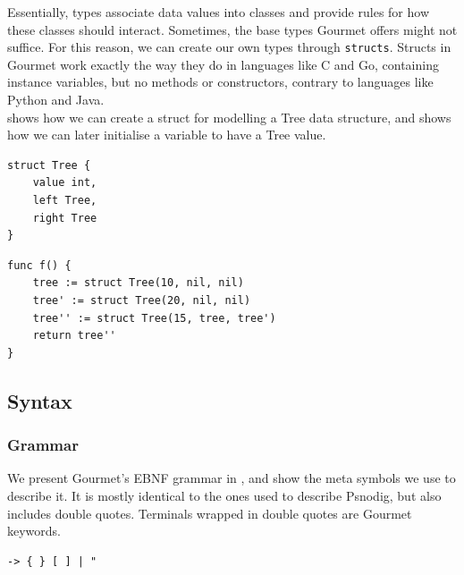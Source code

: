 Essentially, types associate data values into classes and provide rules for how these classes should interact. Sometimes, the base types Gourmet offers might not suffice. For this reason, we can create our own types through \texttt{structs}. Structs in Gourmet work exactly the way they do in languages like C and Go, containing instance variables, but no methods or constructors, contrary to languages like Python and Java. \\

 shows how we can create a struct for modelling a Tree data structure, and  shows how we can later initialise a variable to have a Tree value. \\

\begin{lstlisting}[caption={A Gourmet struct Tree, with instance variables \texttt{value}, \texttt{left} and \texttt{right}.}, captionpos=b, label={Gourmet Tree}]
struct Tree {
    value int,
    left Tree,
    right Tree
}
\end{lstlisting}

\begin{lstlisting}[caption={A function to initialise three Tree structs and return the last one.},captionpos=b, label={A function to initialise three tree structs and return the last one.}]
func f() {
    tree := struct Tree(10, nil, nil)
    tree' := struct Tree(20, nil, nil)
    tree'' := struct Tree(15, tree, tree')
    return tree''
}
\end{lstlisting}

\subsection{Syntax}

\subsubsection{Grammar}

We present Gourmet's EBNF grammar in , and  show the meta symbols we use to describe it. It is mostly identical to the ones used to describe Psnodig, but also includes double quotes. Terminals wrapped in double quotes are Gourmet keywords. \\

\begin{lstlisting}[caption={Meta symbols used in EBNF of Gourmet.}, captionpos=b, label={Meta symbols used in EBNF of Gourmet.}]
-> { } [ ] | "
\end{lstlisting}

